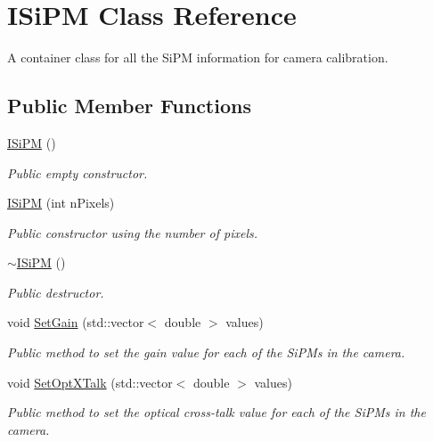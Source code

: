 \hypertarget{classISiPM}{}\section{I\+Si\+PM Class Reference}
\label{classISiPM}


A container class for all the Si\+PM information for camera calibration.  


\subsection*{Public Member Functions}
\begin{DoxyCompactItemize}
\item 
\mbox{\label{classISiPM_a10389a28cc11a3a591de1c249d3f1cd9}} 
\hyperlink{classISiPM_a10389a28cc11a3a591de1c249d3f1cd9}{I\+Si\+PM} ()
\begin{DoxyCompactList}\small\item\em Public empty constructor. \end{DoxyCompactList}\item 
\hyperlink{classISiPM_afa4d53f967af2c55bc355733fd803e97}{I\+Si\+PM} (int n\+Pixels)
\begin{DoxyCompactList}\small\item\em Public constructor using the number of pixels. \end{DoxyCompactList}\item 
\mbox{\label{classISiPM_af5f6a902ed903598c2cb7855fe048857}} 
\hyperlink{classISiPM_af5f6a902ed903598c2cb7855fe048857}{$\sim$\+I\+Si\+PM} ()
\begin{DoxyCompactList}\small\item\em Public destructor. \end{DoxyCompactList}\item 
void \hyperlink{classISiPM_acc5ee63d1ff626fa22d5f522005ca289}{Set\+Gain} (std\+::vector$<$ double $>$ values)
\begin{DoxyCompactList}\small\item\em Public method to set the gain value for each of the Si\+P\+Ms in the camera. \end{DoxyCompactList}\item 
void \hyperlink{classISiPM_a656bda14a56128160c5ff06f01ec8c1e}{Set\+Opt\+X\+Talk} (std\+::vector$<$ double $>$ values)
\begin{DoxyCompactList}\small\item\em Public method to set the optical cross-\/talk value for each of the Si\+P\+Ms in the camera. \end{DoxyCompactList}\item 

\end{DoxyCompactItemize}
